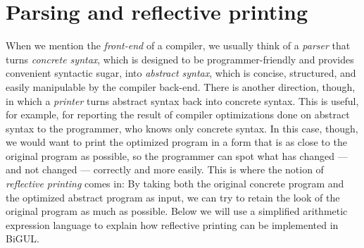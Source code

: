 













\section{Parsing and reflective printing}
\label{sec:BiYacc}


When we mention the \emph{front-end} of a compiler, we usually think of a \emph{parser} that turns \emph{concrete syntax}, which is designed to be programmer-friendly and provides convenient syntactic sugar, into \emph{abstract syntax}, which is concise, structured, and easily manipulable by the compiler back-end.
There is another direction, though, in which a \emph{printer} turns abstract syntax back into concrete syntax.
This is useful, for example, for reporting the result of compiler optimizations done on abstract syntax to the programmer, who knows only concrete syntax.
In this case, though, we would want to print the optimized program in a form that is as close to the original program as possible, so the programmer can spot what has changed --- and not changed --- correctly and more easily.
This is where the notion of \emph{reflective printing} comes in: By taking both the original concrete program and the optimized abstract program as input, we can try to retain the look of the original program as much as possible.
Below we will use a simplified arithmetic expression language to explain how reflective printing can be implemented in BiGUL.

